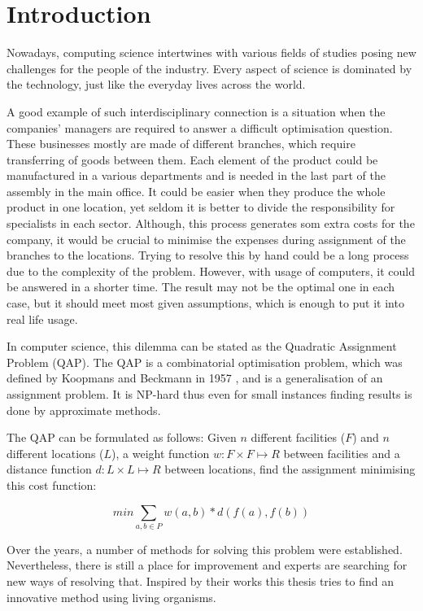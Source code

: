 \chapter{Introduction}
\label{chapter:introduction}

Nowadays, computing science intertwines with various fields of studies posing new challenges for the people of the industry. Every aspect of science is dominated by the technology, just like the everyday lives across the world.

A good example of such interdisciplinary connection is a situation when the companies' managers are required to answer a difficult optimisation question. These businesses mostly are made of different branches, which require transferring of goods between them. Each element of the product could be manufactured in a various departments and is needed in the last part of the assembly in the main office. It could be easier when they produce the whole product in one location, yet seldom it is better to divide the responsibility for specialists in each sector. Although, this process generates som extra costs for the company, it would be crucial to minimise the expenses during assignment of the branches to the locations. Trying to resolve this by hand could be a long process due to the complexity of the problem. However, with usage of computers, it could be answered in a shorter time. The result may not be the optimal one in each case, but it should meet most given assumptions, which is enough to put it into real life usage.

In computer science, this dilemma can be stated as the Quadratic Assignment Problem (QAP).  The QAP is a combinatorial optimisation problem, which was defined by Koopmans and Beckmann in 1957 \cite{koopmans-beckmann1957}, and is a generalisation of an assignment problem. It is NP-hard thus even for small instances finding results is done by approximate methods.

The QAP can be formulated as follows: Given $ n $ different facilities ($F$) and $ n $ different locations ($L$), a weight function $ w: F \times F \mapsto R $ between facilities and a distance function $ d: L \times L \mapsto R $ between locations, find the assignment minimising this cost function:

\begin{equation}
min \sum_{a, b \in P } w(a, b) * d( f(a), f(b))
\end{equation}

Over the years, a number of methods for solving this problem were established. Nevertheless, there is still a place for improvement and experts are searching for new ways of resolving that. Inspired by their works this thesis tries to find an innovative method using living organisms.

